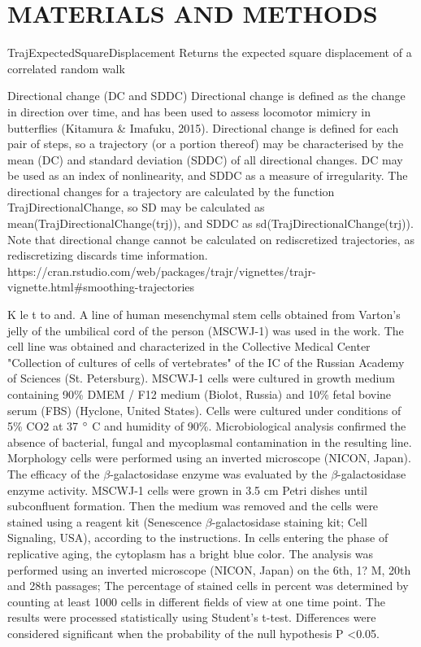 \documentclass[a4paper,12pt]{article}
\begin{document}
\section{MATERIALS AND METHODS}

TrajExpectedSquareDisplacement	Returns the expected square displacement of a correlated random walk

Directional change (DC and SDDC)
Directional change is defined as the change in direction over time, and has been used to assess locomotor mimicry in butterflies (Kitamura & Imafuku, 2015). Directional change is defined for each pair of steps, so a trajectory (or a portion thereof) may be characterised by the mean (DC) and standard deviation (SDDC) of all directional changes. DC may be used as an index of nonlinearity, and SDDC as a measure of irregularity. The directional changes for a trajectory are calculated by the function TrajDirectionalChange, so SD may be calculated as mean(TrajDirectionalChange(trj)), and SDDC as sd(TrajDirectionalChange(trj)). Note that directional change cannot be calculated on rediscretized trajectories, as rediscretizing discards time information.
https://cran.rstudio.com/web/packages/trajr/vignettes/trajr-vignette.html#smoothing-trajectories


K le t to and. A line of human mesenchymal stem cells obtained from Varton's jelly of the umbilical cord of the person (MSCWJ-1) was used in the work. The cell line was obtained and characterized in the Collective Medical Center "Collection of cultures of cells of vertebrates" of the IC of the Russian Academy of Sciences (St. Petersburg). MSCWJ-1 cells were cultured in growth medium containing 90\% DMEM / F12 medium (Biolot, Russia) and 10\% fetal bovine serum (FBS) (Hyclone, United States). Cells were cultured under conditions of 5\% CO2 at 37 $\degree$ C and humidity of 90\%. Microbiological analysis confirmed the absence of bacterial, fungal and mycoplasmal contamination in the resulting line.
 Morphology cells were performed using an inverted microscope (NICON, Japan).
The efficacy of the $\beta$-galactosidase enzyme was evaluated by the $\beta$-galactosidase enzyme activity. MSCWJ-1 cells were grown in 3.5 cm Petri dishes until subconfluent formation. Then the medium was removed and the cells were stained using a reagent kit (Senescence $\beta$-galactosidase staining kit; Cell Signaling, USA), according to the instructions. In cells entering the phase of replicative aging, the cytoplasm has a bright blue color. The analysis was performed using an inverted microscope (NICON, Japan) on the 6th, 1? M, 20th and 28th passages; The percentage of stained cells in percent was determined by counting at least 1000 cells in different fields of view at one time point. The results were processed statistically using Student's t-test. Differences were considered significant when the probability of the null hypothesis P <0.05.
\end{document}
